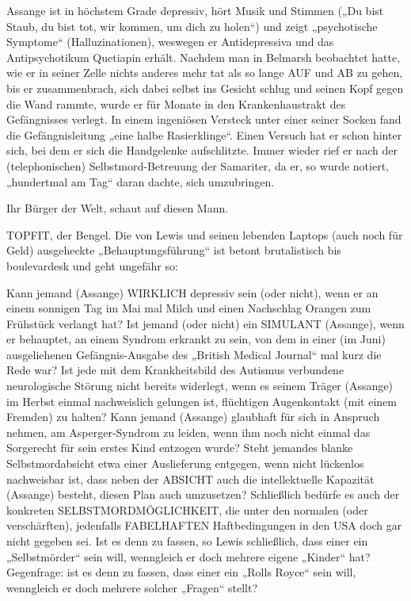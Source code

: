 \begin{multicols}{2}
Assange ist in höchstem Grade depressiv, hört Musik
und Stimmen („Du bist Staub, du bist tot, wir kommen,
um dich zu holen“) und zeigt „psychotische Symptome“
(Halluzinationen), weswegen er Antidepressiva und das
Antipsychotikum Quetiapin erhält. Nachdem man in
Belmarsh beobachtet hatte, wie er in seiner Zelle nichts
anderes mehr tat als so lange AUF und AB zu gehen, bis
er zusammenbrach, sich dabei selbst ins Gesicht schlug
und seinen Kopf gegen die Wand rammte, wurde er für
Monate in den Krankenhaustrakt des Gefängnisses verlegt. In einem ingeniösen Versteck unter einer seiner
Socken fand die Gefängnisleitung „eine halbe Rasierklinge“. Einen Versuch hat er schon hinter sich, bei dem
er sich die Handgelenke aufschlitzte. Immer wieder rief
er nach der (telephonischen) Selbstmord-Betreuung der
Samariter, da er, so wurde notiert, „hundertmal am Tag“
daran dachte, sich umzubringen.

Ihr Bürger der Welt, schaut auf diesen Mann.

TOPFIT, der Bengel. Die von Lewis und seinen lebenden
Laptops (auch noch für Geld) ausgeheckte „Behauptungsführung“ ist betont brutalistisch bis boulevardesk
und geht ungefähr so:

Kann jemand (Assange) WIRKLICH depressiv sein (oder
nicht), wenn er an einem sonnigen Tag im Mai mal Milch
und einen Nachschlag Orangen zum Frühstück verlangt
hat? Ist jemand (oder nicht) ein SIMULANT (Assange),
wenn er behauptet, an einem Syndrom erkrankt zu
sein, von dem in einer (im Juni) ausgeliehenen Gefängnis-Ausgabe des „British Medical Journal“ mal kurz die
Rede war? Ist jede mit dem Krankheitsbild des Autismus verbundene neurologische Störung nicht bereits
widerlegt, wenn es seinem Träger (Assange) im Herbst
einmal nachweislich gelungen ist, flüchtigen Augenkontakt (mit einem Fremden) zu halten? Kann jemand
(Assange) glaubhaft für sich in Anspruch nehmen, am
Asperger-Syndrom zu leiden, wenn ihm noch nicht einmal das Sorgerecht für sein erstes Kind entzogen wurde?
Steht jemandes blanke Selbstmordabsicht etwa einer
Auslieferung entgegen, wenn nicht lückenlos nachweisbar ist, dass neben der ABSICHT auch die intellektuelle
Kapazität (Assange) besteht, diesen Plan auch umzusetzen? Schließlich bedürfe es auch der konkreten SELBSTMORDMÖGLICHKEIT, die unter den normalen (oder
verschärften), jedenfalls FABELHAFTEN Haftbedingungen in den USA doch gar nicht gegeben sei. Ist es denn
zu fassen, so Lewis schließlich, dass einer ein „Selbstmörder“ sein will, wenngleich er doch mehrere eigene
„Kinder“ hat? Gegenfrage: ist es denn zu fassen, dass einer ein „Rolls Royce“ sein will, wenngleich er doch mehrere solcher „Fragen“ stellt?


\end{multicols}
